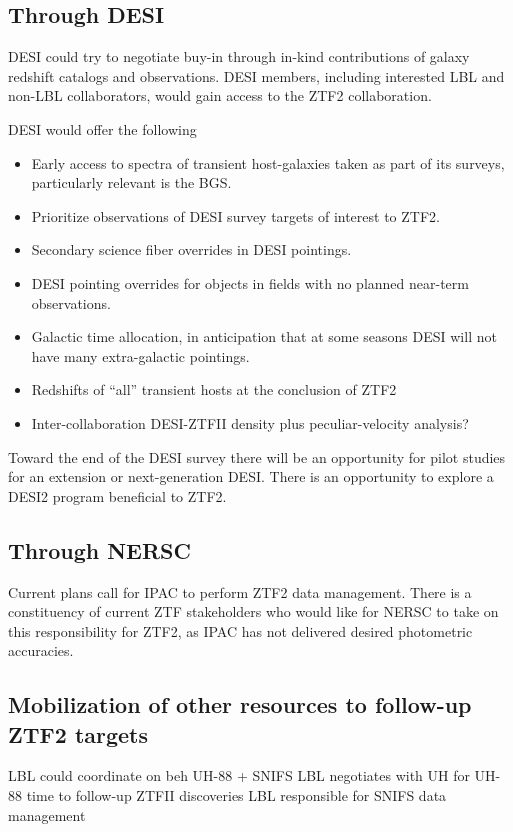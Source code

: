 \documentclass[11pt, oneside]{article}   	%
\begin{document}
\subsection{Through DESI}

DESI could try to negotiate buy-in through in-kind contributions of galaxy redshift catalogs and observations.  DESI members, including interested
LBL and non-LBL collaborators, would gain access to the ZTF2 collaboration.

DESI would offer the following
\begin{itemize}
\item Early access to spectra of transient host-galaxies taken as part of its surveys, particularly relevant is the BGS.
\item Prioritize observations of DESI survey targets of interest to ZTF2.
\item Secondary science fiber overrides in DESI pointings.
\item DESI pointing overrides for objects in fields with no planned near-term observations.
\item Galactic time allocation, in anticipation that at some seasons DESI will not have many extra-galactic pointings.
\item Redshifts of ``all'' transient hosts at the conclusion of ZTF2
\item Inter-collaboration DESI-ZTFII density plus peculiar-velocity analysis?
\end{itemize}

Toward the end of the DESI survey there will be an opportunity for pilot studies for an extension or next-generation DESI.  
There is an opportunity to explore a DESI2 program beneficial to ZTF2.

\subsection{Through NERSC}
Current plans call for IPAC to perform ZTF2 data management. There is a constituency of current ZTF stakeholders who
would like for NERSC to take on this responsibility for ZTF2, as IPAC has not delivered desired photometric accuracies.

\subsection{Mobilization of other resources to follow-up ZTF2 targets}
LBL could coordinate on beh
UH-88 + SNIFS
LBL negotiates with UH for UH-88 time to follow-up ZTFII discoveries
LBL responsible for SNIFS data management
\end{document}
